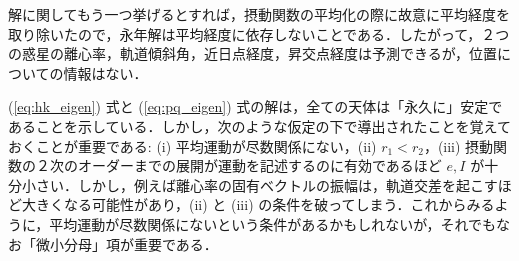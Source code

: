 \documentclass[11pt,a4paper,oneside,onecolumn]{jreport}
\begin{document}
解に関してもう一つ挙げるとすれば，摂動関数の平均化の際に故意に平均経度を取り除いたので，永年解は平均経度に依存しないことである．したがって，２つの惑星の離心率，軌道傾斜角，近日点経度，昇交点経度は予測できるが，位置についての情報はない．

(\ref{eq:hk_eigen}) 式と (\ref{eq:pq_eigen}) 式の解は，全ての天体は「永久に」安定であることを示している．しかし，次のような仮定の下で導出されたことを覚えておくことが重要である: (i) 平均運動が尽数関係にない，(ii) $r_1 < r_2$，(iii) 摂動関数の２次のオーダーまでの展開が運動を記述するのに有効であるほど $e, I$ が十分小さい．しかし，例えば離心率の固有ベクトルの振幅は，軌道交差を起こすほど大きくなる可能性があり，(ii) と (iii) の条件を破ってしまう．これからみるように，平均運動が尽数関係にないという条件があるかもしれないが，それでもなお「微小分母」項が重要である．
\end{document}
